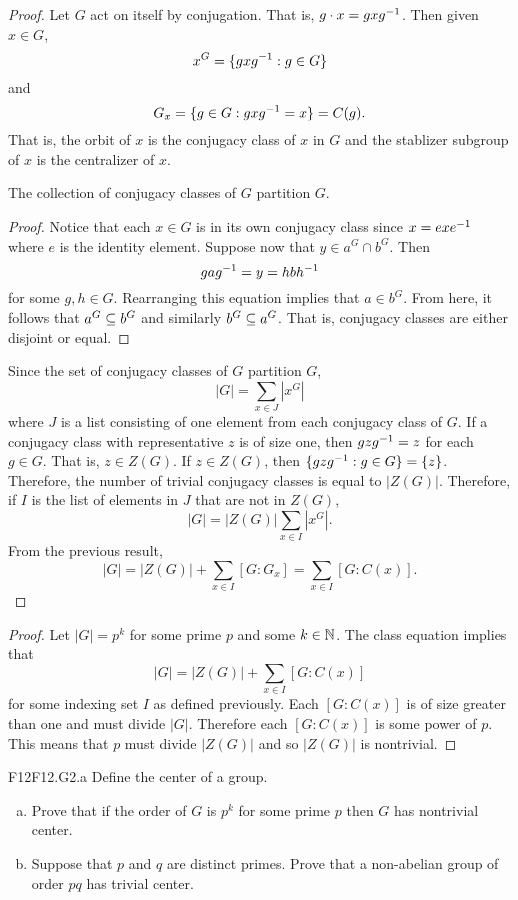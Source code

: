 \documentclass[../AlgebraQualSolutions.tex]{subfiles}
\begin{document}
\begin{proof}
    Let $G$ act on itself by conjugation. That is, $g\cdot x = gxg^{-1}$. Then given $x \in G$,
        \[x^G = \{gxg^{-1}: g \in G\}\]
    and
        \[G_x = \{g \in G: gxg^{-1} = x\} = C(g).\]
    That is, the orbit of $x$ is the conjugacy class of $x$ in $G$ and the stablizer subgroup of $x$ is the centralizer of $x$.
    \begin{claim}
        The collection of conjugacy classes of $G$ partition $G$.

        \begin{proof}
            Notice that each $x \in G$ is in its own conjugacy class since $x = exe^{-1}$ where $e$ is the identity element. Suppose now that $y \in a^G \cap b^G$. Then
                \[gag^{-1} = y = hbh^{-1}\]
            for some $g,h \in G$. Rearranging this equation implies that $a \in b^G$. From here, it follows that $a^G \subseteq b^G$ and similarly $b^G \subseteq a^G$. That is, conjugacy classes are either disjoint or equal.
        \end{proof}
    \end{claim}

    Since the set of conjugacy classes of $G$ partition $G$,
        \[|G| = \sum_{x \in J} |x^G|\]
    where $J$ is a list consisting of one element from each conjugacy class of $G$. If a conjugacy class with representative $z$ is of size one, then
    $gzg^{-1} = z$ for each $g \in G$. That is, $z \in Z(G)$. If $z \in Z(G)$, then $\{gzg^{-1}: g \in G\} = \{z\}$. Therefore, the number of trivial conjugacy classes is equal to $|Z(G)|$. Therefore, if $I$ is the list of elements in $J$ that are not in $Z(G)$,
        \[|G| = |Z(G)| \sum_{x \in I} |x^G|.\]
    From the previous result,
        \[|G| = |Z(G)| + \sum_{x \in I} [G:G_x] = \sum_{x \in I}[G:C(x)].\]
\end{proof}

\begin{proof}
    Let $|G| = p^k$ for some prime $p$ and some $k \in \mathbb{N}$. The class equation implies that
        \[|G| = |Z(G)| + \sum_{x \in I}[G:C(x)]\]
    for some indexing set $I$ as defined previously. Each $[G:C(x)]$ is of size greater than one and must divide $|G|$. Therefore each $[G:C(x)]$ is some power of $p$. This means that $p$ must divide $|Z(G)|$ and so $|Z(G)|$ is nontrivial.
\end{proof}

\begin{prob}{F12}{F12.G2.a}
    Define the center of a group.
    \begin{enumerate}[(a)]
    \item Prove that if the order of $G$ is $p^k$ for some prime $p$ then $G$ has nontrivial center.
    \item Suppose that $p$ and $q$ are distinct primes. Prove that a non-abelian group of order $pq$ has trivial center.
    \end{enumerate}
    \end{prob}
    
\end{document}
